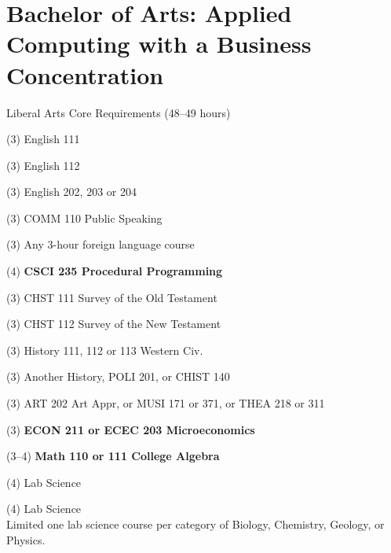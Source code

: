%
\section*{Bachelor of Arts: Applied Computing with a Business Concentration}

\begin{reqgroup}{Liberal Arts Core Requirements (48--49 hours)}
\begin{checklist}
\begin{minipage}[t]{0.5\linewidth}
	\item (3) English 111
	\item (3) English 112
	\item (3) English 202, 203 or 204
	\item (3) COMM 110 Public Speaking
	\item (3) Any 3-hour foreign language course
	\item (4) \textbf{CSCI 235  Procedural Programming}
	\item (3) CHST 111  Survey of the Old Testament
	\item (3) CHST 112  Survey of the New Testament
	\item (3) History 111, 112 or 113 Western Civ.
\end{minipage}
\begin{minipage}[t]{0.5\linewidth}
	\item (3)	Another History, POLI 201, or CHIST 140
	\item (3)	ART 202 Art Appr, or MUSI 171 or 371, or THEA 218 or 311
	\item (3)	\textbf{ECON 211 or ECEC 203 Microeconomics}
	\item (3--4)	\textbf{Math 110 or 111 College Algebra}
	\item (4)	 Lab Science
	\item (4)	 Lab Science\\Limited one lab science course per category of Biology, Chemistry,
Geology, or Physics.
\end{minipage}
\end{checklist}
\end{reqgroup}



